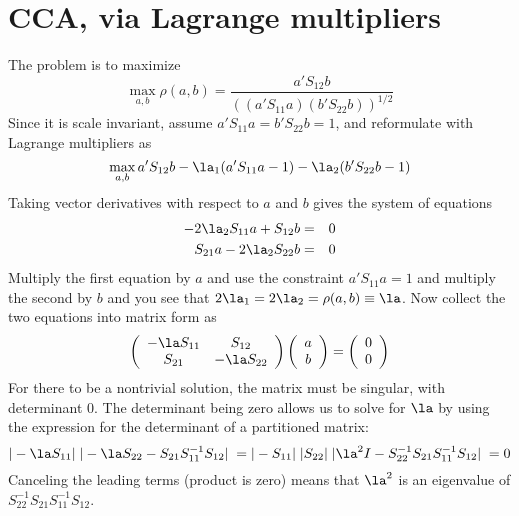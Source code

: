 \documentclass[12pt]{article}
\begin{document}
\section{CCA, via Lagrange multipliers}
\label{sec:ccalag}

 The problem is to maximize
 \begin{equation}
    \max_{a,b} \rho(a,b)=
               \frac{a'S_{12}b}
                    {\left((a'S_{11}a)(b'S_{22}b)\right)^{1/2}}
 \label{eq:cancor}
 \end{equation}
 Since it is scale invariant, assume $a'S_{11}a = b'S_{22}b = 1$, and
reformulate with Lagrange multipliers as
 \begin{equation}
    \max_{a,b} a'S_{12}b - \la_1(a'S_{11}a-1) - \la_2 (b'S_{22}b-1)
 \label{eq:cca}
 \end{equation}
 Taking vector derivatives with respect to $a$ and $b$ gives the system of
 equations 
 \begin{eqnarray*}
   -2\la_2 S_{11} a + S_{12} b &=& 0  \cr
   S_{21} a - 2\la_2 S_{22} b &=& 0
\end{eqnarray*}
 Multiply the first equation by $a$ and use the constraint $a'S_{11}a = 1$ and multiply the second by $b$ and you see that $ 2 \la_1 = 2 \la_2 = \rho(a,b) \equiv \la$.  Now collect the two equations into matrix form as
 \begin{displaymath}
   \left( \begin{array}{cc}
     -\la S_{11} & S_{12} \cr
            S_{21} & -\la S_{22} 
   \end{array} \right)
   \left( \begin{array}{c}  a \cr b \end{array} \right)
   = 
   \left( \begin{array}{c} 0 \cr 0 \end{array} \right)
 \end{displaymath}
 For there to be a nontrivial solution, the matrix must be singular, with
determinant 0. The determinant being zero allows us to solve for $\la$ by using the expression for the determinant of a partitioned matrix:
 \begin{displaymath}
    |-\la  S_{11}| \; |-\la S_{22} - S_{21}S_{11}^{-1}S_{12}| \;
    = 
    |-S_{11}| \; |S_{22}| \;|\la^2I - S_{22}^{-1}S_{21}S_{11}^{-1}S_{12}| \; = 0
 \end{displaymath}
 Canceling the leading terms (product is zero) means that $\la^2$ is an eigenvalue of 
  $S_{22}^{-1}S_{21}S_{11}^{-1}S_{12}$. 
\end{document}
